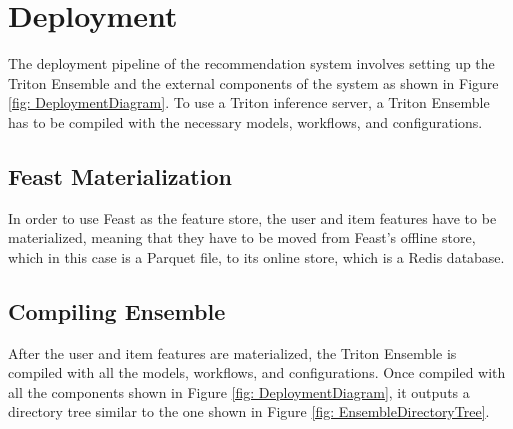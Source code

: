 \section{Deployment}

The deployment pipeline of the recommendation system involves setting up the Triton Ensemble and the external components of the system as shown in Figure \ref{fig: DeploymentDiagram}.
To use a Triton inference server, a Triton Ensemble has to be compiled with the necessary models, workflows, and configurations.

\subsection{Feast Materialization}

In order to use Feast as the feature store, the user and item features have to be materialized, 
meaning that they have to be moved from Feast's offline store, which in this case is a Parquet file, to its online store, which is a Redis database.

\subsection{Compiling Ensemble}

After the user and item features are materialized, the Triton Ensemble is compiled with all the models, workflows, and configurations.
Once compiled with all the components shown in Figure \ref{fig: DeploymentDiagram}, it outputs a directory tree similar to the one shown in Figure \ref{fig: EnsembleDirectoryTree}.

